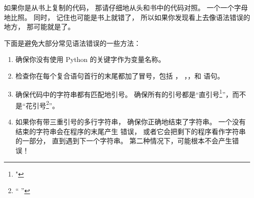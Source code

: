 如果你是从书上复制的代码， 那请仔细地从头和书中的代码对照。  
一个一个字母地比照。  
同时， 记住也可能是书上就错了， 所以如果你发现看上去像语法错误的地方， 那可能就是了。


下面是避免大部分常见语法错误的一些方法：

\begin{enumerate}


\item 确保你没有使用 Python 的关键字作为变量名称。


\item 检查你在每个复合语句首行的末尾都加了冒号，包括 ， ，，和  语句。


\item 确保代码中的字符串都有匹配地引号。  确保所有的引号都是``直引号\footnote{" }''，而不是``花引号\footnote{“ ”}''。


\item 如果你有带三重引号的多行字符串， 确保你正确地结束了字符串。  
一个没有结束的字符串会在程序的末尾产生  错误， 或者它会把剩下的程序看作字符串的一部分， 直到遇到下一个字符串。  
第二种情况下，可能根本不会产生错误！


\end{enumerate}
